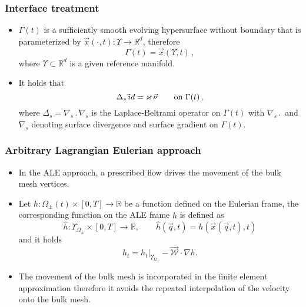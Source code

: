 \documentclass{beamer}
\newcommand{\R}{{\mathbb R}}
\newcommand{\nabs}{\nabla_{\!s}}
\newcommand{\id}{\rm id}
\begin{document}
\begin{frame}
\frametitle{Interface treatment}

\begin{itemize}
\item $\Gamma(t)$ is a sufficiently smooth evolving hypersurface without
boundary that is parameterized by $\vec x(\cdot,t):\Upsilon\to\R^d$, therefore
\begin{equation*}
\Gamma(t) = \vec x(\Upsilon,t)\,,
\end{equation*}
where $\Upsilon\subset \R^d$ is a given reference manifold.

\item It holds that
\begin{equation*}
\Delta_s\, \vec \id = \varkappa\, \vec\nu \qquad \mbox{on $\Gamma(t)$}\,,
\end{equation*}
where $\Delta_s = \nabs\,.\,\nabs$ is the Laplace-Beltrami operator on
$\Gamma(t)$ with $\nabs\,.\,$ and $\nabs$ denoting surface divergence and
surface gradient on $\Gamma(t)$.
\end{itemize}
\end{frame}

\begin{frame}
\frametitle{Arbitrary Lagrangian Eulerian approach}

\begin{itemize}

\item In the ALE approach, a prescribed flow drives the movement of the bulk
mesh vertices.

\item Let $h:\Omega_{\pm}(t)\times [0,T]\to \mathbb{R}$ be a function defined on
the Eulerian frame, the corresponding function on the ALE frame $\hat h$ is
defined as
\begin{equation*}
\hat h:\Upsilon_{\Omega_\pm}\times [0,T]\to \mathbb{R},\qquad
\hat h(\vec q,t)=h(\vec{x}(\vec q,t),t)
\end{equation*}
and it holds
\begin{equation*}
h_t =\left.h_t\right|_{\Upsilon_{\Omega_\pm}} -\vec{\mathcal{W}} \cdot \nabla h.
\end{equation*}

\item The movement of the bulk mesh is incorporated in the finite element
approximation therefore it avoids the repeated interpolation of the
velocity onto the bulk mesh.
\end{itemize}

\end{frame}
\end{document}

